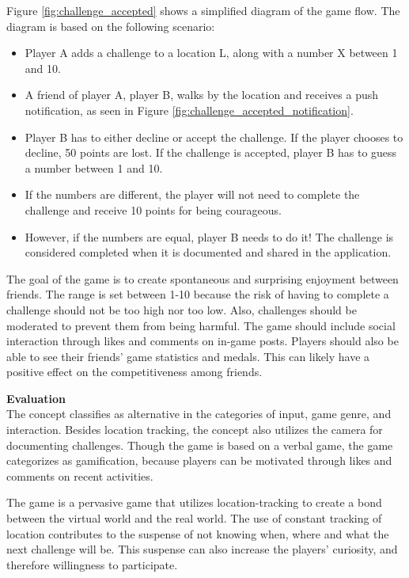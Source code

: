 \documentclass[../Main.tex]{subfiles}
\begin{document}
Figure \ref{fig:challenge_accepted} shows a simplified diagram of the game flow. The diagram is based on the following scenario:

\begin{itemize}
    \item Player A adds a challenge to a location L, along with a number X between 1 and 10.
    \item A friend of player A, player B, walks by the location and receives a push notification, as seen in Figure \ref{fig:challenge_accepted_notification}.
    \item Player B has to either decline or accept the challenge. If the player chooses to decline, 50 points are lost. If the challenge is accepted, player B has to guess a number between 1 and 10.
    \item If the numbers are different, the player will not need to complete the challenge and receive 10 points for being courageous.
    \item However, if the numbers are equal, player B needs to do it! The challenge is considered completed when it is documented and shared in the application.
\end{itemize}

The goal of the game is to create spontaneous and surprising enjoyment between friends. The range is set between 1-10 because the risk of having to complete a challenge should not be too high nor too low. Also, challenges should be moderated to prevent them from being harmful. The game should include social interaction through likes and comments on in-game posts. Players should also be able to see their friends' game statistics and medals. This can likely have a positive effect on the competitiveness among friends.

\textbf{Evaluation} \\
The concept classifies as alternative in the categories of input, game genre, and interaction. Besides location tracking, the concept also utilizes the camera for documenting challenges. Though the game is based on a verbal game, the game categorizes as gamification, because players can be motivated through likes and comments on recent activities. 

The game is a pervasive game that utilizes location-tracking to create a bond between the virtual world and the real world. The use of constant tracking of location contributes to the suspense of not knowing when, where and what the next challenge will be. This suspense can also increase the players’ curiosity, and therefore willingness to participate. 
\end{document}
